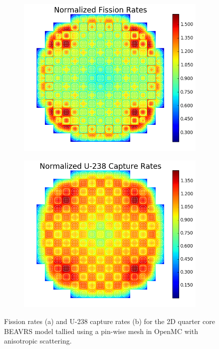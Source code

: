 \begin{appendices}
\begin{figure}[h!]
\begin{subfigure}{\textwidth}
  \centering
  \includegraphics[width=0.75\linewidth]{figures/benchmarks/fission-rates/fiss-mean-full-core-aniso}
  \caption{}
  \label{fig:benchmarks-beavrs-fiss-aniso}
\end{subfigure}
\begin{subfigure}{\textwidth}
  \centering
  \includegraphics[width=0.75\linewidth]{figures/benchmarks/capture-rates/capt-mean-full-core-aniso}
  \caption{}
  \label{fig:benchmarks-beavrs-capt-aniso}
\end{subfigure}
\vspace{2mm}
\caption[BEAVRS pin-wise reaction rates from OpenMC with anisotropic scattering]{Fission rates (a) and U-238 capture rates (b) for the 2D quarter core \ac{BEAVRS} model tallied using a pin-wise mesh in OpenMC with anisotropic scattering.}
\label{fig:benchmarks-beavrs-aniso}
\end{figure}
	


\end{appendices}
